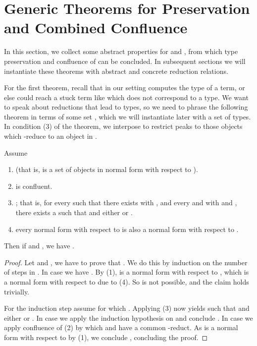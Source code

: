 \documentclass{LMCS}
\begin{document}
\section{Generic Theorems for Preservation and Combined Confluence}
\label{sec:ars}

In this section, we collect some abstract properties for  and
, from which type preservation and confluence of  can
be concluded. In subsequent sections we will instantiate these
theorems with abstract and concrete reduction relations.

For the first theorem, recall that in our setting  computes the
type of a term, or else could reach a stuck term like  which does not correspond to a type.  We want to speak about
reductions that lead to types, so we need to phrase the following
theorem in terms of some set , which we will instantiate later with
a set of types.  In condition (3) of the theorem, we interpose
 to restrict peaks to those objects
which -reduce to an object in .

\begin{thm}
\label{thmtp}
Assume
\begin{enumerate}[\em(1)]
\item  (that is,  is a set of objects in normal form with respect to ).
\item  is confluent.
\item ; that is, for
  every  such that there exists  with
  , and every  and  with  and , there exists a  such that
   and either  or
  .
\item every normal form with respect to 
is also a normal form with respect to .
\end{enumerate}
Then if  and , we have .
\end{thm}

\begin{proof}
Let  and , we have to prove that .  We do this by induction on the number  of steps in . In case  we have .  By (1),  is a normal form with
respect to , which is a normal form with respect to  due
to (4). So  is not possible, and the claim holds
trivially.

For the induction step assume  for which . Applying (3) now yields  such that  and
either  or . In case 
we apply the induction hypothesis on  and conclude
.  In case  we apply
confluence of  (2) by which  and  have a common
-reduct. As  is a normal form with respect to  by
(1), we conclude , concluding the proof.
\end{proof}
\end{document}

